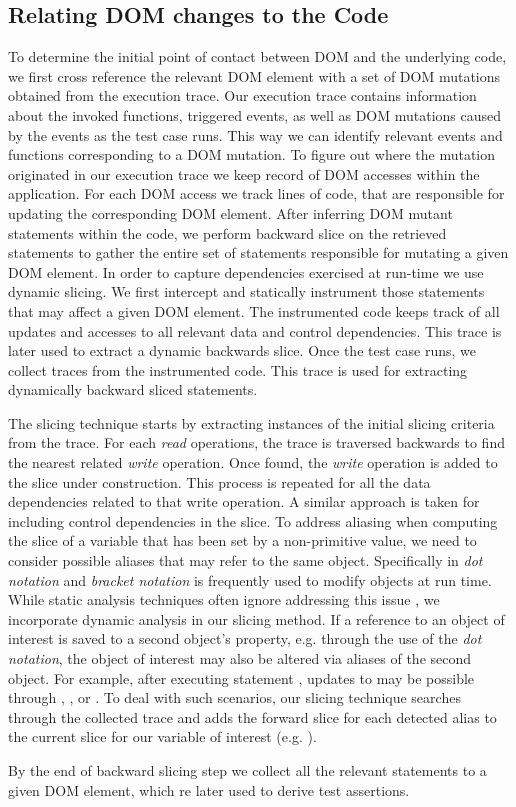 \subsection{Relating DOM changes to the \javascript Code} \label{Sec:domToCode}
To determine the initial point of contact between DOM and the underlying \javascript code, we first cross reference the relevant DOM element with a set of DOM mutations obtained from the execution trace. Our execution trace contains information about the invoked functions, triggered events, as well as DOM mutations caused by the events as the test case runs. This way we can identify relevant events and functions corresponding to a DOM mutation. To figure out where the mutation originated in our execution trace we keep record of DOM accesses within the application. For each DOM access we track \javascript lines of code, that are responsible for updating the corresponding DOM element. After inferring DOM mutant statements within the code, we perform backward slice on the retrieved statements to gather the entire set of \javascript statements responsible for mutating a given DOM element. 
In order to capture dependencies exercised at run-time we use dynamic slicing. We first intercept and statically instrument those statements that may affect a given DOM element. The instrumented code keeps track of all updates and accesses to all relevant data and control dependencies. This trace is later used to extract a dynamic backwards slice.    
Once the test case runs, we collect traces from the instrumented code. This trace is used for extracting dynamically backward sliced statements.

The slicing technique starts by extracting instances of the initial slicing criteria from the trace. For each \textit{read} operations, the trace is traversed backwards to find the nearest related \textit{write} operation. Once found, the \textit{write} operation is added to the slice under construction. This process is repeated for all the data dependencies related to that write operation. A similar approach is taken for including control dependencies in the slice.
To address aliasing when computing the slice of a variable that has been set by a non-primitive value, we need to consider possible aliases that may refer to the same object. Specifically in \javascript \textit{dot notation} and \textit{bracket notation} is frequently used to modify objects at run time. While static analysis techniques often ignore addressing this issue \cite{Feldthaus:icse13}, we incorporate dynamic analysis in our slicing method. If a reference to an object of interest is saved to a second object's property, e.g. through the use of the \textit{dot notation}, the object of interest may also be altered via aliases of the second object. For example, after executing statement , updates to  may be possible through , , or . To deal with such scenarios, our slicing technique searches through the collected trace and adds the forward slice for each detected alias to the current slice for our variable of interest (e.g. ). 

By the end of backward slicing step we collect all the relevant statements to a given DOM element, which re later used to derive test assertions.    